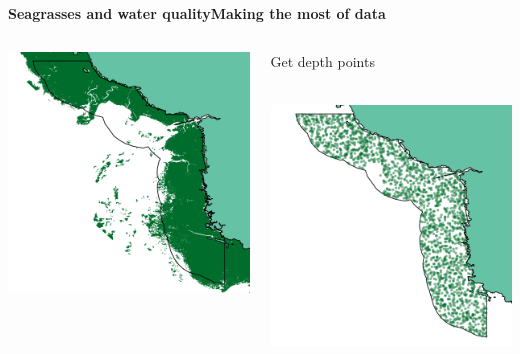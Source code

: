 \documentclass[serif]{beamer}\usepackage[]{graphicx}\usepackage[]{color}
\makeatletter
\def\maxwidth{ %
  \ifdim\Gin@nat@width>\linewidth
    \linewidth
  \else
    \Gin@nat@width
  \fi
}
\newenvironment{knitrout}{}{} %
\makeatother
\begin{document}
\begin{frame}{\textbf{Seagrasses and water quality}}{\textbf{Making the most of data}}
\begin{columns}[T]
\begin{column}{0.32\textwidth}
\begin{knitrout}
{\centering \includegraphics[width=\maxwidth]{fig//segsg} 

}



\end{knitrout}
\end{column}
\onslide<+->
\begin{column}{0.32\textwidth}
Get depth points\\~\\
\begin{knitrout}
\color{fgcolor}

{\centering \includegraphics[width=\maxwidth]{fig//segpt} 

}
\end{knitrout}
\end{column}
\end{columns}
\end{frame}
\end{document}
